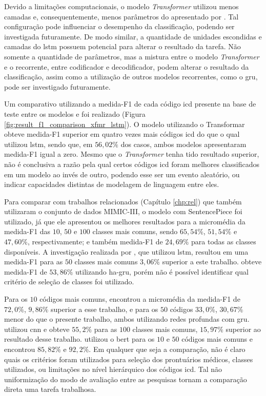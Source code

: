 Devido a limitações computacionais, o modelo \textit{Transformer} utilizou menos camadas e, consequentemente, menos parâmetros do apresentado por \textcite{Vaswani2017Attention}. Tal configuração pode influenciar o desempenho da classificação, podendo ser investigada futuramente. De modo similar, a quantidade de unidades escondidas e camadas do \gls{lstm} possuem potencial para alterar o resultado da tarefa. Não somente a quantidade de parâmetros, mas a mistura entre o modelo \textit{Transformer} e o recorrente, entre codificador e decodificador, podem alterar o resultado da classificação, assim como a utilização de outros modelos recorrentes, como o \gls{gru}, pode ser investigado futuramente.

Um comparativo utilizando a medida-F1 de cada código \gls{icd} presente na base de teste entre os modelos \xfmrxfmr{} e \lstmlstm{} foi realizado (Figura \ref{fig:result_f1_comparison_xfmr_lstm}). O modelo utilizando o Transformar obteve medida-F1 superior em quatro vezes mais códigos \gls{icd} do que o qual utilizou \gls{lstm}, sendo que, em $56,02\%$ dos casos, ambos modelos apresentaram medida-F1 igual a zero. Mesmo que o \textit{Transformer} tenha tido resultado superior, não é conclusiva a razão pela qual certos códigos \gls{icd} foram melhores classificados em um modelo ao invés de outro, podendo esse ser um evento aleatório, ou indicar capacidades distintas de modelagem de linguagem entre eles.

Para comparar com trabalhos relacionados (Capítulo \ref{chp:rel}) que também utilizaram o conjunto de dados MIMIC-III, o modelo \xfmrxfmr{} com SentencePiece foi utilizado, já que ele apresentou os melhores resultados para a micromédia da medida-F1 das $10$, $50$ e $100$ classes mais comuns, sendo $65,54\%$, $51,54\%$ e $47,60\%$, respectivamente; e também medida-F1 de $24,69\%$ para todas as classes disponíveis. A investigação realizada por \textcite{Shi2017TowardsAutomatedICD}, que utilizou \gls{lstm}, resultou em uma medida-F1 para as $50$ classes mais comuns $3,06\%$ superior a este trabalho. \textcite{Baumel2018MultiLabelCO} obteve medida-F1 de $53,86\%$ utilizando \gls{ha-gru}, porém não é possível identificar qual critério de seleção de classes foi utilizado.

Para os $10$ códigos mais comuns, \textcite{Huang2019AnEE} encontrou a micromédia da medida-F1 de $72,0\%$, $9,86\%$ superior a esse trabalho, e para os $50$ códigos $33,0\%$, $30,67\%$ menor do que o presente trabalho, ambos utilizando redes profundas com \gls{gru}. \textcite{Hsu2020MultiLabel} utilizou \gls{cnn} e obteve $55,2\%$ para as $100$ classes mais comuns, $15,97\%$ superior ao resultado desse trabalho. \textcite{Singh2020MultiLabel} utilizou o \gls{bert} para os $10$ e $50$ códigos mais comuns e encontrou $85,82\%$ e $92,2\%$. Em qualquer que seja a comparação, não é claro quais os critérios foram utilizados para seleção dos prontuários médicos, classes utilizados, ou limitações no nível hierárquico dos códigos \gls{icd}. Tal não uniformização do modo de avaliação entre as pesquisas tornam a comparação direta uma tarefa trabalhosa.

